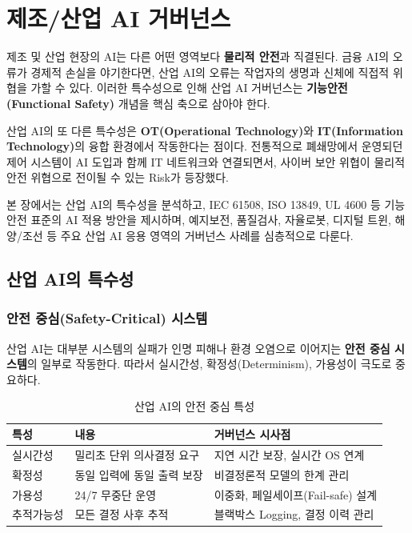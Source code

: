 
\chapter{제조/산업 AI 거버넌스}
\label{ch:industrial_governance}

제조 및 산업 현장의 AI는\cite{li2023trustworthy} 다른 어떤 영역보다 \textbf{물리적 안전}과 직결된다. 금융 AI의 오류가 경제적 손실을 야기한다면, 산업 AI의 오류는 작업자의 생명과 신체에 직접적 위협을 가할 수 있다. 이러한 특수성으로 인해 산업 AI 거버넌스는 \textbf{기능안전(Functional Safety)} 개념을 핵심 축으로 삼아야 한다.

산업 AI의 또 다른 특수성은 \textbf{OT(Operational Technology)}와 \textbf{IT(Information Technology)}의 융합 환경에서 작동한다는 점이다. 전통적으로 폐쇄망에서 운영되던 제어 시스템이 AI 도입과 함께 IT 네트워크와 연결되면서, 사이버 보안 위협이 물리적 안전 위협\cite{lee2018cyber}으로 전이될 수 있는 Risk가 등장했다.

본 장에서는 산업 AI의 특수성을 분석하고, IEC 61508, ISO 13849, UL 4600 등 기능안전 표준의 AI 적용 방안을 제시하며, 예지보전\cite{wuest2016machine}, 품질검사, 자율로봇, 디지털 트윈\cite{tao2018digital}, 해양/조선 등 주요 산업 AI\cite{wang2018towards} 응용 영역의 거버넌스 사례를 심층적으로 다룬다.

\section{산업 AI의 특수성}
\label{sec:19.1}

\subsection{안전 중심(Safety-Critical) 시스템}
\label{sec:19.1.1}

산업 AI는 대부분 시스템의 실패가 인명 피해나 환경 오염으로 이어지는 \textbf{안전 중심 시스템}의 일부로 작동한다. 따라서 실시간성, 확정성(Determinism), 가용성이 극도로 중요하다.

\begin{table}[htbp]
\centering
\caption{산업 AI의 안전 중심 특성}
\label{tab:19_1}
\begin{tabularx}{\textwidth}{p{2cm}Xp{5cm}}
\toprule
\textbf{특성} & \textbf{내용} & \textbf{거버넌스 시사점} \\
\midrule
실시간성 & 밀리초 단위 의사결정 요구 & 지연 시간 보장, 실시간 OS 연계 \\
확정성 & 동일 입력에 동일 출력 보장 & 비결정론적 모델의 한계 관리 \\
가용성 & 24/7 무중단 운영\cite{klaise2021monitoring} & 이중화, 페일세이프(Fail-safe) 설계 \\
추적가능성 & 모든 결정 사후 추적 & 블랙박스 Logging, 결정 이력 관리 \\
\bottomrule
\end{tabularx}
\end{table}

